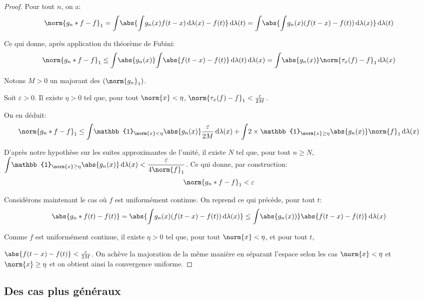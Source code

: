 \begin{proof}
Pour tout $n$, on a:
\[
\norm{g_n*f - f}_1 = \displaystyle{\int} \abs{\displaystyle{\int} g_n(x) f(t-x) \, \mathrm d \lambda(x) - f(t)} \, \mathrm d \lambda(t) = \displaystyle{\int} \abs{\displaystyle{\int} g_n(x) (f(t-x)-f(t)) \, \mathrm d \lambda(x)} \, \mathrm d \lambda(t)
\]

Ce qui donne, après application du théorème de Fubini:
\[
\norm{g_n*f - f}_1 \leq \displaystyle{\int}  \abs{g_n(x)} \displaystyle{\int} \abs{f(t-x)-f(t)} \, \mathrm d \lambda(t) \, \mathrm d \lambda(x) = \displaystyle{\int} \abs{g_n(x)} \norm{\tau_x(f) - f}_1 \, \mathrm d \lambda(x)
\]

Notons $M>0$ un majorant des $\left (\norm{g_n}_1\right )$.

Soit $\varepsilon>0$. Il existe $\eta>0$ tel que, pour tout $\norm{x} < \eta$, $\norm{\tau_x(f) - f}_1 < \frac{\varepsilon}{2M}$.

On en déduit:
\[
\norm{g_n*f - f}_1  \leq \displaystyle{\int} \mathbb{1}_{\norm{x}<\eta} \abs{g_n(x)} \frac{\varepsilon}{2M}  \, \mathrm d \lambda(x) + \displaystyle{\int} 2 \times \mathbb{1}_{\norm{x} \geq \eta} \abs{g_n(x)} \norm{f}_1 \,  \mathrm d \lambda(x)
\]

D'après notre hypothèse sur les suites approximantes de l'unité, il existe $N$ tel que, pour tout $n \geq N$, $\displaystyle{\int} \mathbb{1}_{\norm{x} \geq \eta} \abs{g_n(x)}  \,  \mathrm d \lambda(x) < \frac{\varepsilon}{4 \norm{f}_1}$. Ce qui donne, par construction:
\[
\norm{g_n*f - f}_1 < \varepsilon
\]

Considérons maintenant le cas où $f$ est uniformément continue. On reprend ce qui précède, pour tout $t$:
\[
\abs{g_n*f(t) - f(t)} = \abs{\displaystyle{\int} g_n(x) (f(t-x)-f(t)) \, \mathrm d \lambda(x)} \leq \displaystyle{\int} \abs{g_n(x))} \abs{f(t-x)-f(t)} \, \mathrm d \lambda(x)
\]

Comme $f$ est uniformément continue, il existe $\eta > 0$ tel que, pour tout $\norm{x} < \eta$, et pour tout $t$, 

$\abs{f(t-x)-f(t)} < \frac{\varepsilon}{2M}$. On achève la majoration de la même manière en séparant l'espace selon les cas $\norm{x} < \eta$ et $\norm{x} \geq \eta$ et on obtient ainsi la convergence uniforme.
\end{proof}

\subsection{Des cas plus généraux}

